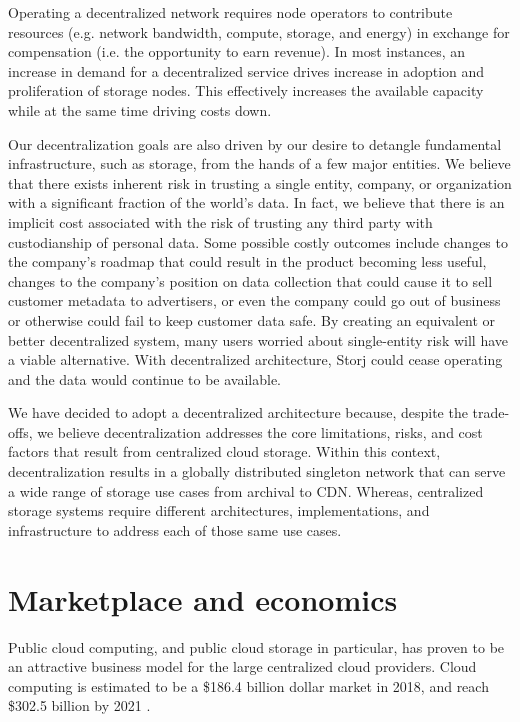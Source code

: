 \documentclass[11pt,fleqn,openany]{book}
\begin{document}
Operating a decentralized network requires node operators to contribute
resources (e.g. network bandwidth, compute, storage, and energy) in exchange
for compensation (i.e. the opportunity to earn revenue).
In most instances, an increase in demand for a decentralized service drives
increase in adoption and proliferation of storage nodes.
This effectively increases the available capacity while at the same time
driving costs down.

Our decentralization goals are also driven by our desire to detangle
fundamental infrastructure, such as storage, from the hands of a few major
entities.
We believe that there exists inherent risk in trusting a single entity,
company, or organization with a significant fraction of the world's data.
In fact, we believe that there is an implicit cost associated with the risk of
trusting any third party with custodianship of personal data.
Some possible costly outcomes include changes to the company's roadmap that could result in the product
becoming less useful, changes to the company's position on data collection that could
cause it to sell customer metadata to advertisers, or even the company could go
out of business or otherwise could fail to keep customer data safe.
By creating an equivalent or better decentralized
system, many users worried about single-entity risk will have a viable
alternative.
With decentralized architecture, Storj could cease operating and the data
would continue to be available.

We have decided to adopt a decentralized architecture because, despite the trade-offs, we believe decentralization addresses the core limitations,
risks, and cost factors that result from centralized cloud storage.
Within this context,
decentralization results in a globally distributed singleton network that can
serve a wide range of storage use cases from archival to CDN. Whereas,
centralized storage systems require different architectures, implementations,
and infrastructure to address each of those same use cases.

\section{Marketplace and economics}

Public cloud computing, and public cloud storage in particular, has
proven to be an attractive business model for the large centralized cloud
providers. Cloud computing is estimated to be a \$186.4 billion dollar market
in 2018, and reach \$302.5 billion by 2021 \cite{gartner-cloud-growth}.
\end{document}
